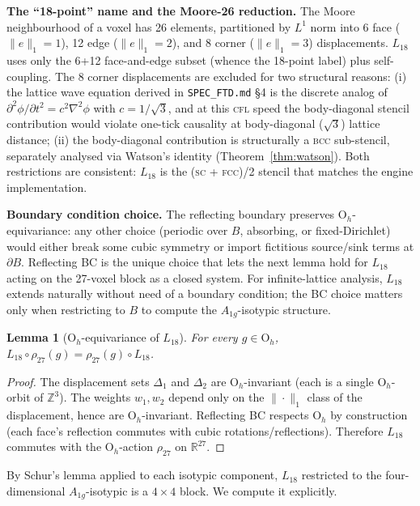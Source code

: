 \documentclass[11pt,reqno]{amsart}
\theoremstyle{plain}
\newtheorem{lemma}[theorem]{Lemma}
\theoremstyle{definition}
\theoremstyle{remark}
\numberwithin{equation}{section}
\newcommand{\Ohgrp}{\mathrm{O}_h}
\newcommand{\Aoneg}{A_{1g}}
\begin{document}
\textbf{The ``18-point'' name and the Moore-26 reduction.} The Moore
neighbourhood of a voxel has 26 elements, partitioned by $L^{1}$ norm
into 6 face ($\|e\|_{1} = 1$), 12 edge ($\|e\|_{1} = 2$), and 8
corner ($\|e\|_{1} = 3$) displacements. $L_{18}$ uses only the 6+12
face-and-edge subset (whence the 18-point label) plus self-coupling.
The 8 corner displacements are excluded for two structural reasons:
(i) the lattice wave equation derived in \texttt{SPEC\_FTD.md} \S 4 is
the discrete analog of $\partial^{2}\phi/\partial t^{2} = c^{2}\nabla^{2}\phi$
with $c = 1/\sqrt{3}$, and at this \textsc{cfl} speed the body-diagonal
stencil contribution would violate one-tick causality at body-diagonal
($\sqrt{3}$) lattice distance; (ii) the body-diagonal contribution is
structurally a \textsc{bcc} sub-stencil, separately analysed via
Watson's identity (Theorem~\ref{thm:watson}). Both restrictions are
consistent: $L_{18}$ is the (\textsc{sc} + \textsc{fcc})/2 stencil that
matches the engine implementation.

\textbf{Boundary condition choice.} The reflecting boundary preserves
$\Ohgrp$-equivariance: any other choice (periodic over $B$, absorbing,
or fixed-Dirichlet) would either break some cubic symmetry or import
fictitious source/sink terms at $\partial B$. Reflecting BC is the
unique choice that lets the next lemma hold for $L_{18}$ acting on
the 27-voxel block as a closed system. For infinite-lattice analysis,
$L_{18}$ extends naturally without need of a boundary condition; the
BC choice matters only when restricting to $B$ to compute the
$\Aoneg$-isotypic structure.

\begin{lemma}[$\Ohgrp$-equivariance of $L_{18}$]
\label{lem:equiv}
For every $g \in \Ohgrp$, $L_{18}\circ\rho_{27}(g) =
\rho_{27}(g)\circ L_{18}$.
\end{lemma}

\begin{proof}
The displacement sets $\Delta_{1}$ and $\Delta_{2}$ are
$\Ohgrp$-invariant (each is a single $\Ohgrp$-orbit of $\mathbb{Z}^{3}$).
The weights $w_{1}, w_{2}$ depend only on the $\|\cdot\|_{1}$ class
of the displacement, hence are $\Ohgrp$-invariant. Reflecting BC
respects $\Ohgrp$ by construction (each face's reflection commutes
with cubic rotations/reflections). Therefore $L_{18}$ commutes with
the $\Ohgrp$-action $\rho_{27}$ on $\mathbb{R}^{27}$.
\end{proof}

By Schur's lemma applied to each isotypic component, $L_{18}$
restricted to the four-dimensional $\Aoneg$-isotypic is a
$4 \times 4$ block. We compute it explicitly.
\end{document}
